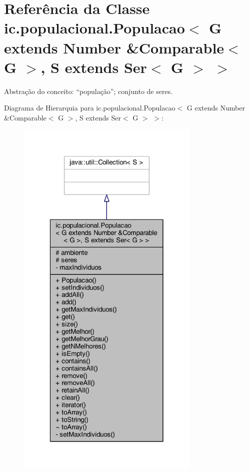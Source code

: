\hypertarget{classic_1_1populacional_1_1_populacao_3_01_g_01extends_01_number_01_6_comparable_3_01_g_01_4_00_506237fa66af7bbd01f529b68d4beaca}{\section{Referência da Classe ic.\-populacional.\-Populacao$<$ G extends Number \&Comparable$<$ G $>$, S extends Ser$<$ G $>$ $>$}
\label{classic_1_1populacional_1_1_populacao_3_01_g_01extends_01_number_01_6_comparable_3_01_g_01_4_00_506237fa66af7bbd01f529b68d4beaca}
}


Abstração do conceito\-: “população”; conjunto de seres.  




Diagrama de Hierarquia para ic.\-populacional.\-Populacao$<$ G extends Number \&Comparable$<$ G $>$, S extends Ser$<$ G $>$ $>$\-:
\nopagebreak
\begin{figure}[H]
\begin{center}
\leavevmode
\includegraphics[width=248pt]{classic_1_1populacional_1_1_populacao_3_01_g_01extends_01_number_01_6_comparable_3_01_g_01_4_00_fe344a962d2d07afef79097d39aa7a37}
\end{center}
\end{figure}


